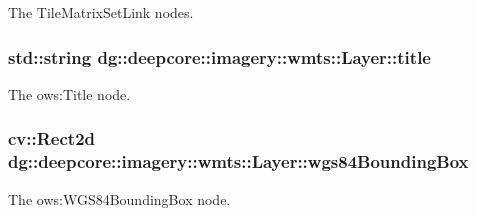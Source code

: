 The Tile\+Matrix\+Set\+Link nodes. 

\subsubsection[{\texorpdfstring{title}{title}}]{\setlength{\rightskip}{0pt plus 5cm}std\+::string dg\+::deepcore\+::imagery\+::wmts\+::\+Layer\+::title}\hypertarget{structdg_1_1deepcore_1_1imagery_1_1wmts_1_1_layer_a31a9052e2ccbf947e87c236f94172ceb}{}\label{structdg_1_1deepcore_1_1imagery_1_1wmts_1_1_layer_a31a9052e2ccbf947e87c236f94172ceb}


The ows\+:Title node. 

\subsubsection[{\texorpdfstring{wgs84\+Bounding\+Box}{wgs84BoundingBox}}]{\setlength{\rightskip}{0pt plus 5cm}cv\+::\+Rect2d dg\+::deepcore\+::imagery\+::wmts\+::\+Layer\+::wgs84\+Bounding\+Box}\hypertarget{structdg_1_1deepcore_1_1imagery_1_1wmts_1_1_layer_aa5965fd52b8132c904f537024885ff88}{}\label{structdg_1_1deepcore_1_1imagery_1_1wmts_1_1_layer_aa5965fd52b8132c904f537024885ff88}


The ows\+:W\+G\+S84\+Bounding\+Box node. 

